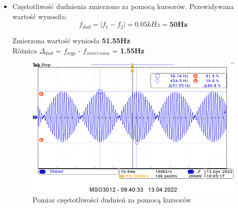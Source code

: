 \begin{itemize}
    \item Częstotliwość dudnienia zmierzono za pomocą kursorów. Przewidywana wartość wynosiła:
        \begin{equation}
            f_{dud} = |f_1 - f_2| = 0.05kHz = \textbf{50Hz}
        \end{equation}
        \begin{center}
            Zmierzona wartość wyniosła \textbf{51.55Hz} \\
            Różnica $\Delta_{dud}$ = $f_{wyp}$ - $f_{zmierzona}$ = \textbf{1.55Hz}
        \end{center}
        \begin{figure}[h]
            \centering
            \includegraphics[scale=0.33]{img/osciloscope/1_3_dudnienia_cropped.png}
            \caption{Pomiar częstotliwości dudnień za pomocą kursorów}
            \label{fig:cz_dudnienia}
        \end{figure}
\end{itemize}